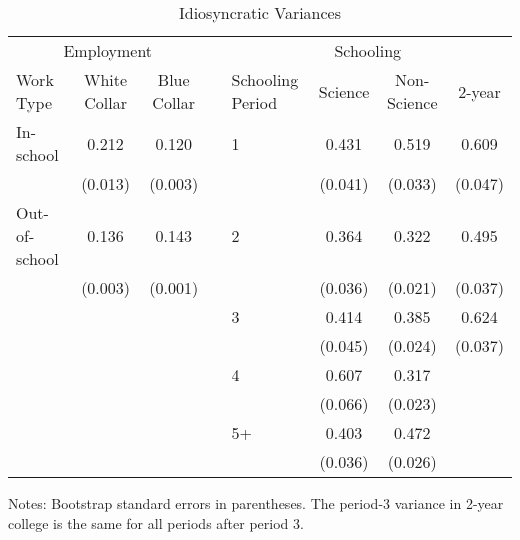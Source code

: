 \begin{table}[ht]
\caption{Idiosyncratic Variances}
\label{tab:trans}
\centering
\begin{threeparttable}
\begin{tabular}{lccllccc}
\toprule
\multicolumn{3}{c}{Employment} & & \multicolumn{4}{c}{Schooling} \\ 
\cmidrule(r){1-3}\cmidrule(l){5-8}
Work Type & White Collar & Blue Collar & & Schooling Period & Science & Non-Science & 2-year \\ 
\midrule
In-school & 0.212 & 0.120 & & 1 & 0.431 & 0.519 & 0.609 \\ 
 & (0.013) & (0.003) & & & (0.041) & (0.033) & (0.047) \\ 
Out-of-school & 0.136 & 0.143 & & 2 & 0.364 & 0.322 & 0.495 \\ 
 & (0.003) & (0.001) & & & (0.036) & (0.021) & (0.037) \\ 
 & & & & 3  & 0.414 & 0.385 & 0.624 \\ 
 & & & &    & (0.045) & (0.024) & (0.037) \\ 
 & & & & 4  & 0.607   & 0.317   & \\ 
 & & & &    & (0.066) & (0.023) & \\ 
 & & & & 5+ & 0.403   & 0.472   & \\ 
 & & & &    & (0.036) & (0.026) & \\ 
\bottomrule
\end{tabular}
\footnotesize Notes: Bootstrap standard errors in parentheses. The period-3 variance in 2-year college is the same for all periods after period 3. 
\end{threeparttable}
\end{table}
